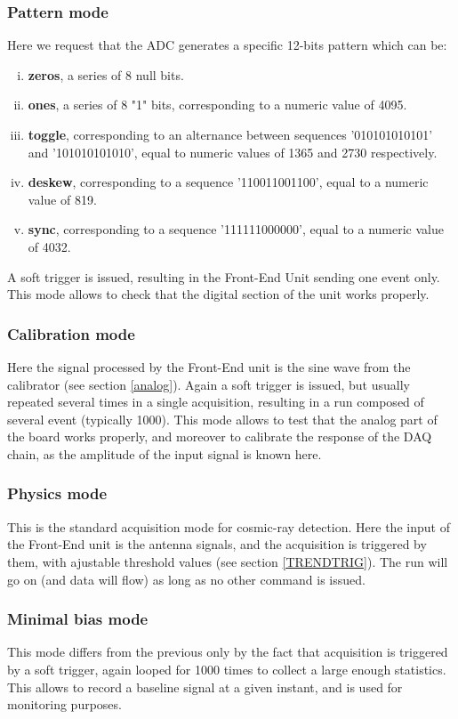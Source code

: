 \subsubsection{Pattern mode}
\label{pattern}
Here we request that the ADC generates a specific 12-bits pattern which can be:
\begin{enumerate}[i)]
\item{{\bf zeros}, a series of 8 null bits.}
\item{{\bf ones}, a series of 8 "1" bits, corresponding to a numeric value of 4095.}
\item{{\bf toggle}, corresponding to an alternance between sequences '010101010101' and  '101010101010', equal to numeric values of 1365 and 2730 respectively.}
\item{{\bf deskew}, corresponding to a sequence '110011001100', equal to a numeric value of 819.}
\item{{\bf sync}, corresponding to a sequence '111111000000', equal to a numeric value of 4032.}
\end{enumerate} 
A soft trigger is issued, resulting in the Front-End Unit sending one event only. This mode allows to check that the digital section of the unit works properly.

\subsubsection{Calibration mode}
Here the signal processed by the Front-End unit is the sine wave from the calibrator (see section \ref{analog}). Again a soft trigger is issued, but usually repeated several times in a single acquisition, resulting in a run composed of several event (typically 1000). This mode allows to test that the analog part of the board works properly, and moreover to calibrate the response of the DAQ chain, as the amplitude of the input signal is known here.

\subsubsection{Physics mode}
This is the standard acquisition mode for cosmic-ray detection. Here the input of the Front-End unit is the antenna signals, and the acquisition is triggered by them, with ajustable threshold values (see section \ref{TRENDTRIG}). The run will go on (and data will flow) as long as no other command is issued. 

\subsubsection{Minimal bias mode}
This mode differs from the previous only by the fact that acquisition is triggered by a soft trigger, again looped for 1000 times to collect a large enough statistics. This allows to record a baseline signal at a given instant, and is used for monitoring purposes. 

